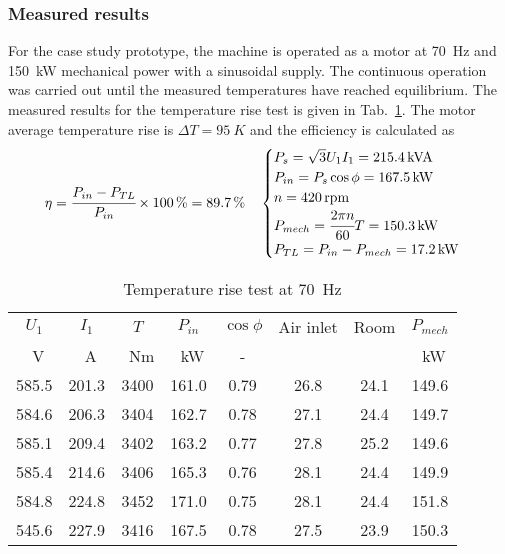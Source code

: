 \subsubsection{Measured results}
For the case study prototype, the machine is operated as a motor at \SI{70}{Hz} and \SI{150}{kW} mechanical power with a sinusoidal supply. The continuous operation was carried out until the measured temperatures have reached equilibrium.  The measured results for the temperature rise test is given in Tab.~\ref{tab:TemperatureRiseTestAt70Hz}. The motor average temperature rise is $\Delta T=\SI{95}{K}$ and the efficiency is calculated as
\begin{equation}
 \label{eqn:eta}
 \eta = \cfrac{P_{in}-P_{TL}}{P_{in}}\times \SI{100}{\%}=\SI{89.7}{\%}
 \quad
 \begin{cases}
 P_s = \sqrt{3}U_1 I_1=\SI{215.4}{kVA} \\
 P_{in} = P_s \cos \phi = \SI{167.5}{kW} \\
 n = \SI{420}{rpm}\\
 P_{mech}=\cfrac{2\pi n}{60}T=\SI{150.3}{kW}\\
 P_{TL} = P_{in}-P_{mech}=\SI{17.2}{kW}
 \end{cases}
\end{equation}  
\begin{table}[htbp]
	\centering
	\caption{Temperature rise test at \SI{70}{Hz}}
	\begin{tabular}{cccccccc}
		\toprule
			$U_1$         &%
			$I_1$         &%
			$T$           &%
			$P_{in}$      &%
			$\cos\phi$    &%
			Air inlet     &%
			Room          &%
			$P_{mech}$%
			\\
			\SI{}{V}      &%
			\SI{}{A}      &%
			\SI{}{Nm}     &%
			\SI{}{kW}     &%
			-             &%
			\SI{}{\degC}  &%
			\SI{}{\degC}  &%
			\SI{}{kW}%
			\\
			\midrule
			585.5  & 201.3 & 3400 & 161.0  & 0.79 & 26.8 & 24.1 & 149.6\\
			584.6  & 206.3 & 3404 & 162.7  & 0.78 & 27.1 & 24.4 & 149.7\\
			585.1  & 209.4 & 3402 & 163.2  & 0.77 & 27.8 & 25.2 & 149.6\\
			585.4  & 214.6 & 3406 & 165.3  & 0.76 & 28.1 & 24.4 & 149.9\\
			584.8  & 224.8 & 3452 & 171.0  & 0.75 & 28.1 & 24.4 & 151.8\\
			545.6  & 227.9 & 3416 & 167.5  & 0.78 & 27.5 & 23.9 & 150.3\\
			\bottomrule
	\end{tabular}
	\label{tab:TemperatureRiseTestAt70Hz}
\end{table} 

